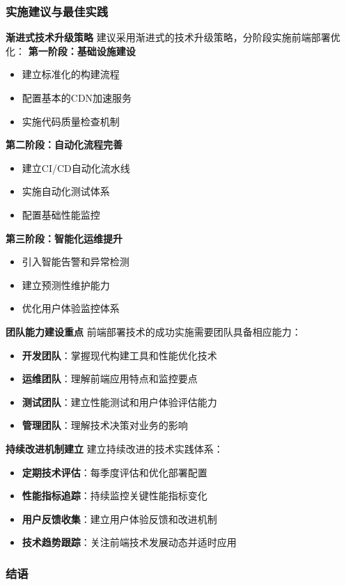 \subsubsection{实施建议与最佳实践}\label{ux5b9eux65bdux5efaux8baeux4e0eux6700ux4f73ux5b9eux8df5} \textbf{渐进式技术升级策略}
建议采用渐进式的技术升级策略，分阶段实施前端部署优化： \textbf{第一阶段：基础设施建设} \begin{itemize} \tightlist \item 建立标准化的构建流程 \item 配置基本的CDN加速服务 \item
实施代码质量检查机制 \end{itemize} \textbf{第二阶段：自动化流程完善} \begin{itemize} \tightlist \item 建立CI/CD自动化流水线 \item 实施自动化测试体系 \item
配置基础性能监控 \end{itemize} \textbf{第三阶段：智能化运维提升} \begin{itemize} \tightlist \item 引入智能告警和异常检测 \item 建立预测性维护能力 \item
优化用户体验监控体系 \end{itemize} \textbf{团队能力建设重点} 前端部署技术的成功实施需要团队具备相应能力： \begin{itemize} \tightlist \item
\textbf{开发团队}：掌握现代构建工具和性能优化技术 \item \textbf{运维团队}：理解前端应用特点和监控要点\\ \item \textbf{测试团队}：建立性能测试和用户体验评估能力 \item
\textbf{管理团队}：理解技术决策对业务的影响 \end{itemize} \textbf{持续改进机制建立} 建立持续改进的技术实践体系： \begin{itemize} \tightlist \item
\textbf{定期技术评估}：每季度评估和优化部署配置 \item \textbf{性能指标追踪}：持续监控关键性能指标变化 \item \textbf{用户反馈收集}：建立用户体验反馈和改进机制 \item
\textbf{技术趋势跟踪}：关注前端技术发展动态并适时应用 \end{itemize} \subsubsection{结语}\label{ux7ed3ux8bed-1}
